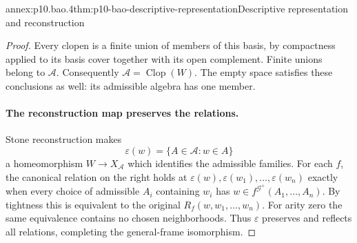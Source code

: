 \begin{annexitem}{annex:p10.bao.4}{thm:p10-bao-descriptive-representation}{Descriptive representation and reconstruction}
\begin{proof}
Every clopen is a finite union of members of this basis, by
compactness applied to its basis cover together with its open
complement. Finite unions belong to \(\mathcal A\).
Consequently \(\mathcal A=\operatorname{Clop}(W)\).
The empty space satisfies these conclusions as well: its
admissible algebra has one member.

\paragraph{The reconstruction map preserves the relations.}
Stone reconstruction makes
\[
 \varepsilon(w)=\{A\in\mathcal A:w\in A\}
\]
a homeomorphism \(W\to X_{\mathcal A}\) which identifies the
admissible families.
For each \(f\), the canonical relation on the right holds at
\(\varepsilon(w),\varepsilon(w_1),\ldots,\varepsilon(w_n)\)
exactly when every choice of admissible \(A_i\) containing \(w_i\)
has \(w\in f^{\mathcal G^+}(A_1,\ldots,A_n)\).
By tightness this is equivalent to the original
\(R_f(w,w_1,\ldots,w_n)\).
For arity zero the same equivalence contains no chosen neighborhoods.
Thus \(\varepsilon\) preserves and reflects all relations,
completing the general-frame isomorphism.
\end{proof}
\end{annexitem}

